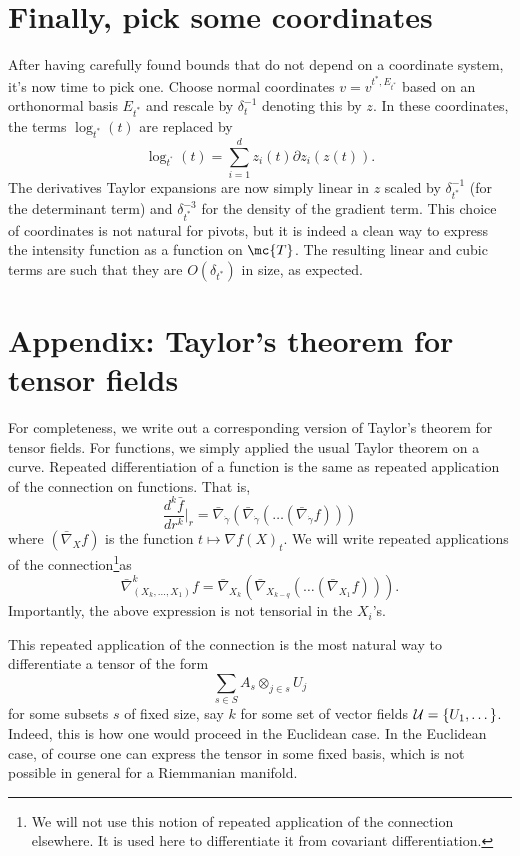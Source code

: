 \documentclass{article}
\begin{document}
\section{Finally, pick some coordinates}

After having carefully found bounds that do not depend on a coordinate system, it's now time to pick one. Choose
normal coordinates $v=v^{t^*,E_{t^*}}$ based on an orthonormal basis $E_{t^*}$ and rescale by $\delta_t^{-1}$ denoting this by $z$. In these coordinates, the terms $\log_{t^*}(t)$ are replaced by
$$
\log_{t^^*}(t) = \sum_{i=1}^d z_i(t) \partial z_i(z(t)).
$$
The derivatives Taylor expansions are now simply linear in $z$ scaled by $\delta_{t^*}^{-1}$
(for the determinant term) and $\delta_{t^*}^{-3}$ for the density of the gradient term. This choice of coordinates is not natural for 
pivots, but it is indeed a clean way to express the intensity function as a function on $\mc{T}$. The resulting
linear and cubic terms are such that they are $O(\delta_{t^*})$ in size, as expected. 

 

\section{Appendix: Taylor's theorem for tensor fields}

For completeness, we write  out a corresponding version of Taylor's theorem for tensor fields. For functions, we simply applied
the usual Taylor theorem on a curve. Repeated differentiation of a function is the same
as repeated application of the connection on functions. That is,
$$
\frac{d^k \bar{f}}{dr^k}\biggl|_r = \bar{\nabla}_{\dot{\gamma}} \left(\bar{\nabla}_{\dot{\gamma}}\left(\dots \left(\bar{\nabla}_{\dot{\gamma}}f\right) \right)\right)
$$
where $(\bar{\nabla}_{X}f)$ is  the function $t \mapsto \nabla f(X)_t$. We will write repeated applications of the connection\footnote{We will not use this notion
of repeated application of the connection elsewhere. It is used here to differentiate it from covariant differentiation.}as
$$
\bar{\nabla}^k_{(X_k, \dots, X_1)} f = \bar{\nabla}_{X_k}\left(\bar{\nabla}_{X_{k-q}} \left( \dots \left(\bar{\nabla}_{X_1}f\right)\right)\right).
$$
Importantly, the above expression is not tensorial in the $X_i$'s.

This repeated application of the connection is the most
natural way to differentiate a tensor of the form
$$
\sum_{s \in S} A_s \otimes_{j \in s} U_j
$$
for some subsets $s$ of fixed size, say $k$ for some set of vector fields ${\cal U} = \{U_1, \dots\}$. Indeed, this is how one would proceed in the Euclidean case. In the Euclidean case, of course one can express the tensor in some fixed basis, which is
not possible in general for a Riemmanian manifold.
\end{document}
